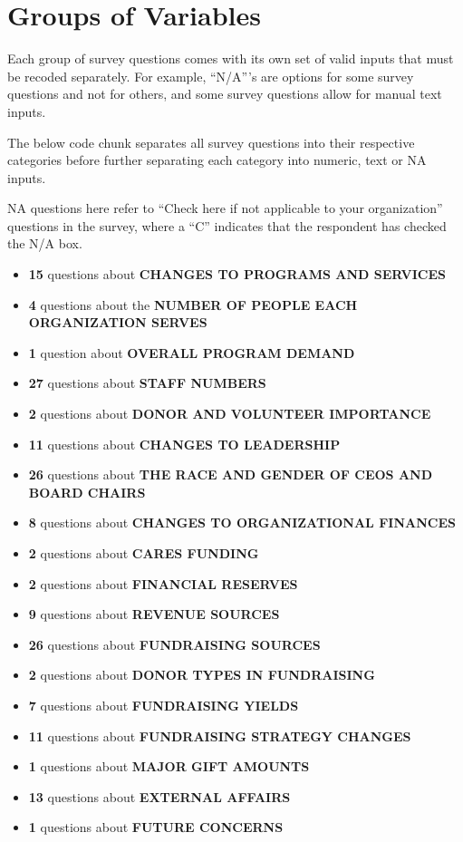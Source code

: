 \documentclass[
  letterpaper,
]{scrbook}
\providecommand{\tightlist}{%
  \setlength{\itemsep}{0pt}\setlength{\parskip}{0pt}}\usepackage{longtable,booktabs,array}
\begin{document}
\part{Groups of Variables}

Each group of survey questions comes with its own set of valid inputs
that must be recoded separately. For example, ``N/A'''s are options for
some survey questions and not for others, and some survey questions
allow for manual text inputs.

The below code chunk separates all survey questions into their
respective categories before further separating each category into
numeric, text or NA inputs.

NA questions here refer to ``Check here if not applicable to your
organization'' questions in the survey, where a ``C'' indicates that the
respondent has checked the N/A box.

\begin{itemize}
\tightlist
\item
  \textbf{15} questions about \textbf{CHANGES TO PROGRAMS AND SERVICES}
\item
  \textbf{4} questions about the \textbf{NUMBER OF PEOPLE EACH
  ORGANIZATION SERVES}
\item
  \textbf{1} question about \textbf{OVERALL PROGRAM DEMAND}
\item
  \textbf{27} questions about \textbf{STAFF NUMBERS}
\item
  \textbf{2} questions about \textbf{DONOR AND VOLUNTEER IMPORTANCE}
\item
  \textbf{11} questions about \textbf{CHANGES TO LEADERSHIP}
\item
  \textbf{26} questions about \textbf{THE RACE AND GENDER OF CEOS AND
  BOARD CHAIRS}
\item
  \textbf{8} questions about \textbf{CHANGES TO ORGANIZATIONAL FINANCES}
\item
  \textbf{2} questions about \textbf{CARES FUNDING}
\item
  \textbf{2} questions about \textbf{FINANCIAL RESERVES}
\item
  \textbf{9} questions about \textbf{REVENUE SOURCES}
\item
  \textbf{26} questions about \textbf{FUNDRAISING SOURCES}
\item
  \textbf{2} questions about \textbf{DONOR TYPES IN FUNDRAISING}
\item
  \textbf{7} questions about \textbf{FUNDRAISING YIELDS}
\item
  \textbf{11} questions about \textbf{FUNDRAISING STRATEGY CHANGES}
\item
  \textbf{1} questions about \textbf{MAJOR GIFT AMOUNTS}
\item
  \textbf{13} questions about \textbf{EXTERNAL AFFAIRS}\\
\item
  \textbf{1} questions about \textbf{FUTURE CONCERNS}
\end{itemize}
\end{document}
